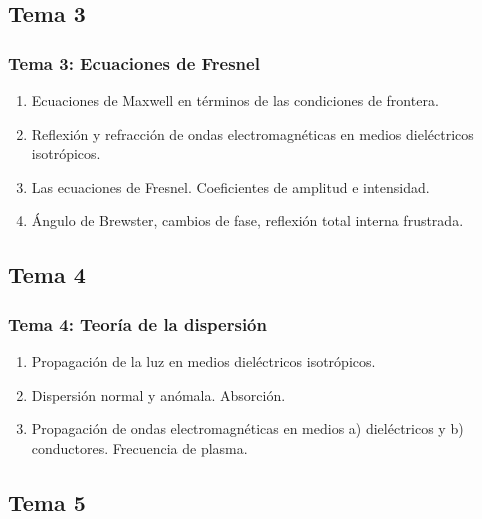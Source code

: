 \documentclass[12pt]{beamer}
\begin{document}
\subsection*{Tema 3}

\begin{frame}
\frametitle{\textbf{Tema 3: Ecuaciones de Fresnel}}
\begin{enumerate}[<+->]
\item Ecuaciones de Maxwell en términos de las condiciones de frontera.
\item Reflexión y refracción de ondas electromagnéticas en medios dieléctricos isotrópicos.
\item Las ecuaciones de Fresnel. Coeficientes de amplitud e intensidad.
\item Ángulo de Brewster, cambios de fase, reflexión total interna frustrada.
\end{enumerate}
\end{frame}

\subsection*{Tema 4}

\begin{frame}
\frametitle{\textbf{Tema 4: Teoría de la dispersión}}
\begin{enumerate}[<+->]
\item Propagación de la luz en medios dieléctricos isotrópicos.
\item Dispersión normal y anómala. Absorción.
\item Propagación de ondas electromagnéticas en medios a) dieléctricos y b) conductores. Frecuencia de plasma.
\end{enumerate}
\end{frame}

\subsection*{Tema 5}
\end{document}

